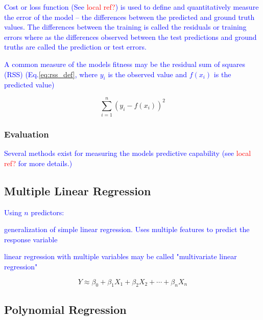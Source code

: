\textcolor{blue}{Cost or loss function (See \textcolor{red}{local ref?}) is used to define and quantitatively measure the error of the model -- the differences between the predicted and ground truth values. The differences between the training is called the residuals or training errors where as the differences observed between the test predictions and ground truths are called the prediction or test errors.}

\textcolor{blue}{A common measure of the models fitness may be the {residual sum of squares (RSS)} (Eq.\ref{eq:rss_def}, where $y_i$ is the observed value and $f(x_i)$ is the predicted value)}

\begin{equation}
{\sum_{i=1}^{n}{(y_i - f(x_i))^2}}
\label{eq:rss_def}
\end{equation}


\subsubsection{Evaluation}

\textcolor{blue}{Several methods exist for measuring the models predictive capability (see \textcolor{red}{local ref?} for more details.)}


\subsection{Multiple Linear Regression}

\textcolor{blue}{Using $n$ predictors:}

\textcolor{blue}{generalization of simple linear regression. Uses multiple features to predict the response variable}

\textcolor{blue}{linear regression with multiple variables may be called "multivariate linear regression"}



\begin{equation}
{Y \approx \beta_0 + \beta_1 X_1 + \beta_2 X_2 + \cdots + \beta_n X_n}
\label{eq:mlr_ex}
\end{equation}


\subsection{Polynomial Regression}


